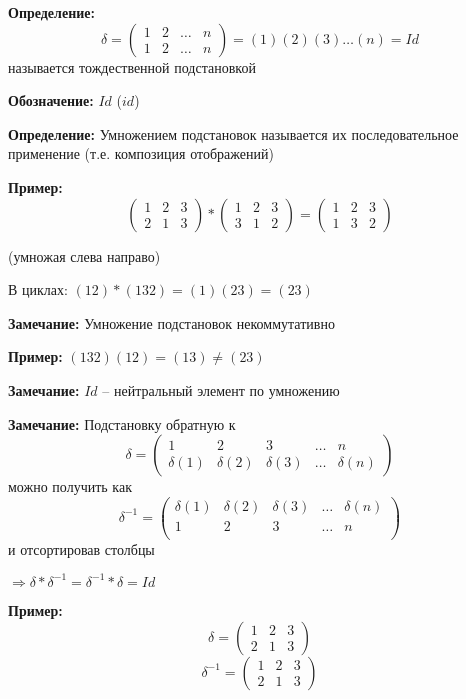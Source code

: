 \documentclass[a4paper,12pt]{article}
\begin{document}
	{\bf Определение: }
	\[
		\delta =
		\begin{pmatrix}
			1 & 2 & \ldots & n \\
			1 & 2 & \ldots & n
		\end{pmatrix}
		= (1)(2)(3)\ldots(n)=Id
	\]
	называется тождественной подстановкой

	{\bf Обозначение: } $Id$ ($id$)

	{\bf Определение: } Умножением подстановок называется их последовательное применение (т.е. композиция отображений)

	{\bf Пример: }
	\[
		\begin{pmatrix}
			1 & 2 & 3 \\
			2 & 1 & 3
		\end{pmatrix}
		* 
		\begin{pmatrix}
			1 & 2 & 3 \\
			3 & 1 & 2
		\end{pmatrix}
		=
		\begin{pmatrix}
			1 & 2 & 3 \\
			1 & 3 & 2
		\end{pmatrix}
	\]

	(умножая слева направо)

	В циклах: $(12) * (132) = (1)(23) = (23)$

	{\bf Замечание: } Умножение подстановок некоммутативно

	{\bf Пример: } $(132)(12) = (13) \neq (23)$

	{\bf Замечание: } $Id$ -- нейтральный элемент по умножению

	{\bf Замечание: } Подстановку обратную к
	\[
		\delta = 
		\begin{pmatrix}
			1 & 2 & 3 & \ldots & n \\
			\delta(1) & \delta(2) & \delta(3) & \ldots & \delta(n)
		\end{pmatrix}
	\]
	можно получить как
	\[
		\delta^{-1} = 
		\begin{pmatrix}
			\delta(1) & \delta(2) & \delta(3) & \ldots & \delta(n) \\
			1 & 2 & 3 & \ldots & n \\
		\end{pmatrix}
	\]
	и отсортировав столбцы

	$\Rightarrow \delta * \delta^{-1} = \delta^{-1} * \delta = Id$

	{\bf Пример: }
	\[
		\delta = 
		\begin{pmatrix}
			1 & 2 & 3 \\
			2 & 1 & 3
		\end{pmatrix}
	\]
	\[
		\delta^{-1} = 
		\begin{pmatrix}
			1 & 2 & 3 \\
			2 & 1 & 3
		\end{pmatrix}
	\]
\end{document}
